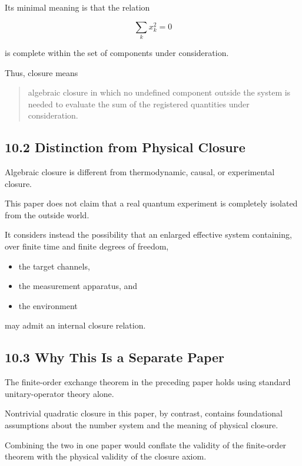 \documentclass[
  a4paper,
  10pt]{article}
\providecommand{\tightlist}{%
  \setlength{\itemsep}{0pt}\setlength{\parskip}{0pt}}
\begin{document}
Its minimal meaning is that the relation

\[
\sum_kx_k^2=0
\]

is complete within the set of components under consideration.

Thus, closure means

\begin{quote}
algebraic closure in which no undefined component outside the system is
needed to evaluate the sum of the registered quantities under
consideration.
\end{quote}

\subsection{10.2 Distinction from Physical
Closure}\label{102-distinction-from-physical-closure}

Algebraic closure is different from thermodynamic, causal, or
experimental closure.

This paper does not claim that a real quantum experiment is completely
isolated from the outside world.

It considers instead the possibility that an enlarged effective system
containing, over finite time and finite degrees of freedom,

\begin{itemize}
\tightlist
\item
  the target channels,
\item
  the measurement apparatus, and
\item
  the environment
\end{itemize}

may admit an internal closure relation.

\subsection{10.3 Why This Is a Separate
Paper}\label{103-why-this-is-a-separate-paper}

The finite-order exchange theorem in the preceding paper holds using
standard unitary-operator theory alone.

Nontrivial quadratic closure in this paper, by contrast, contains
foundational assumptions about the number system and the meaning of
physical closure.

Combining the two in one paper would conflate the validity of the
finite-order theorem with the physical validity of the closure axiom.
\end{document}
